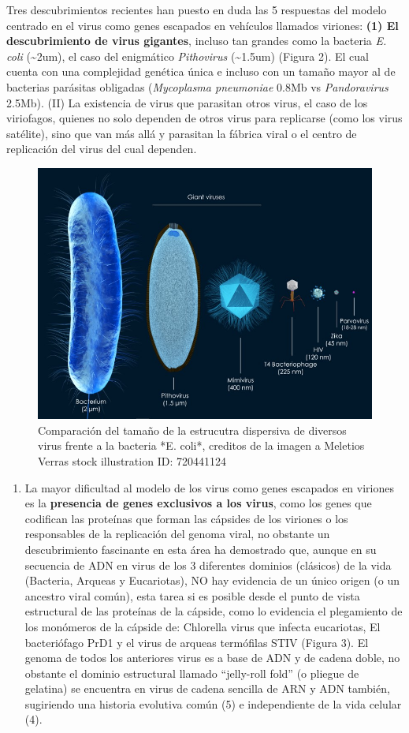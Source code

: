 \documentclass[
  12pt, krantz2,
  spanish,
]{krantz}
\providecommand{\tightlist}{%
  \setlength{\itemsep}{0pt}\setlength{\parskip}{0pt}}
\begin{document}
Tres descubrimientos recientes han puesto en duda las 5 respuestas del modelo centrado en el virus como genes escapados en vehículos llamados viriones: \textbf{(1) El descubrimiento de virus gigantes}, incluso tan grandes como la bacteria \emph{E. coli} (\textasciitilde2um), el caso del enigmático \emph{Pithovirus} (\textasciitilde1.5um) (Figura 2). El cual cuenta con una complejidad genética única e incluso con un tamaño mayor al de bacterias parásitas obligadas (\emph{Mycoplasma pneumoniae} 0.8Mb vs \emph{Pandoravirus} 2.5Mb). (II) La existencia de virus que parasitan otros virus, el caso de los viriofagos, quienes no solo dependen de otros virus para replicarse (como los virus satélite), sino que van más allá y parasitan la fábrica viral o el centro de replicación del virus del cual dependen.

\begin{figure}
\includegraphics[width=0.8\linewidth]{figures/sizes} \caption{ Comparación del tamaño de la estrucutra dispersiva de diversos virus frente a la bacteria *E. coli*, creditos de la imagen a Meletios Verras stock illustration ID: 720441124}\label{fig:sizes}
\end{figure}

\begin{enumerate}
\def\labelenumi{(\Roman{enumi})}
\setcounter{enumi}{2}
\tightlist
\item
  La mayor dificultad al modelo de los virus como genes escapados en viriones es la \textbf{presencia de genes exclusivos a los virus}, como los genes que codifican las proteínas que forman las cápsides de los viriones o los responsables de la replicación del genoma viral, no obstante un descubrimiento fascinante en esta área ha demostrado que, aunque en su secuencia de ADN en virus de los 3 diferentes dominios (clásicos) de la vida (Bacteria, Arqueas y Eucariotas), NO hay evidencia de un único origen (o un ancestro viral común), esta tarea si es posible desde el punto de vista estructural de las proteínas de la cápside, como lo evidencia el plegamiento de los monómeros de la cápside de: Chlorella virus que infecta eucariotas, El bacteriófago PrD1 y el virus de arqueas termófilas STIV (Figura 3). El genoma de todos los anteriores virus es a base de ADN y de cadena doble, no obstante el dominio estructural llamado ``jelly-roll fold'' (o pliegue de gelatina) se encuentra en virus de cadena sencilla de ARN y ADN también, sugiriendo una historia evolutiva común (5) e independiente de la vida celular (4).
\end{enumerate}
\end{document}
